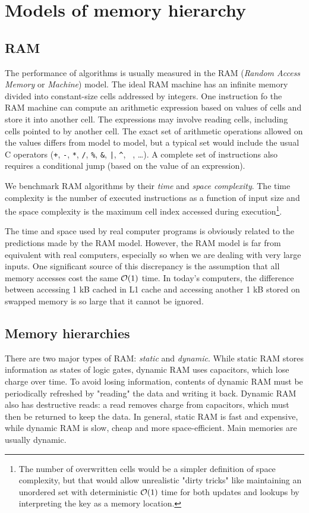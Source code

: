 \chapter{Models of memory hierarchy}
\label{chapter:models}
\section{RAM}

The performance of algorithms is usually measured in the RAM
(\textit{Random Access Memory} or \textit{Machine}) model.
The ideal RAM machine has an infinite memory divided into constant-size
cells addressed by integers.
One instruction fo the RAM machine can compute an arithmetic expression
based on values of cells and store it into another cell. The expressions
may involve reading cells, including cells pointed to by another cell.
The exact set of arithmetic operations allowed on the values differs
from model to model, but a typical set would include the usual C operators
(\texttt{+}, \texttt{-}, \texttt{*}, \texttt{/}, \texttt{\%}, \texttt{\&},
 \texttt{|}, \texttt{\^}, \texttt{~}, \dots).
A complete set of instructions also requires a conditional jump (based on
the value of an expression).

We benchmark RAM algorithms by their \textit{time} and \textit{space complexity}.
The time complexity is the number of executed instructions as a function of
input size and the space complexity is the maximum cell index accessed during
execution\footnote{
	The number of overwritten cells would be a simpler definition
	of space complexity, but that would allow unrealistic "dirty tricks"
	like maintaining an unordered set with deterministic $\mathcal{O}(1)$ time
	for both updates and lookups by interpreting the key as a memory
	location.
}.

The time and space used by real computer programs is obviously related
to the predictions made by the RAM model. However, the RAM model is far
from equivalent with real computers, especially so when we are dealing with
very large inputs. One significant source of this discrepancy is the assumption
that all memory accesses cost the same $\mathcal{O}(1)$ time. In today's computers,
the difference between accessing 1 kB cached in L1 cache and accessing
another 1 kB stored on swapped memory is so large that it cannot be ignored.

\section{Memory hierarchies}
There are two major types of RAM: \textit{static} and \textit{dynamic}.
While static RAM stores information as states of logic gates, dynamic RAM
uses capacitors, which lose charge over time. To avoid losing information,
contents of dynamic RAM must be periodically refreshed by "reading" the data
and writing it back. Dynamic RAM also has destructive reads: a read removes
charge from capacitors, which must then be returned to keep the data.
In general, static RAM is fast and expensive, while dynamic RAM is slow,
cheap and more space-efficient. Main memories are usually dynamic.

